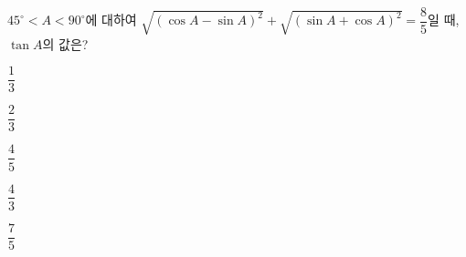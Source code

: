 $45^\circ<A<90^\circ$에 대하여 $\sqrt{(\cos A-\sin A)^2}+\sqrt{(\sin A+\cos A)^2}=\dfrac{8}{5}$일 때, $\tan A$의 값은?
\begin{choices32}{\rule[-3ex]{0pt}{8ex}$\dfrac{1}{3}$}{\rule[-3ex]{0pt}{8ex}$\dfrac{2}{3}$}{\rule[-3ex]{0pt}{8ex}$\dfrac{4}{5}$}{\rule[-3ex]{0pt}{8ex}$\dfrac{4}{3}$}{\rule[-3ex]{0pt}{8ex}$\dfrac{7}{5}$}\end{choices32}

